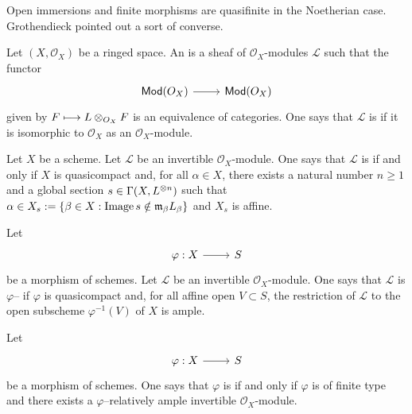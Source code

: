 \documentclass [11 pt, oneside] {article}
\begin{document}
Open immersions and finite morphisms are quasifinite in the Noetherian case. Grothendieck pointed out a sort of converse.

\begin{definition}\label{this oneno}\text{}
Let $(X,\mathscr{O}_X)$ be a ringed space. An  is a sheaf of $\mathscr{O}_X$-modules $\mathscr{L}$ such that the functor 
\[
\begin{tikzcd}
\catn{Mod}({\mathscr{O}_X})\ar[r]& \catn{Mod}({\mathscr{O}_X})
\end{tikzcd}
\]
given by $\relax{F}\longmapsto \relax{L}\otimes_{\relax{O}_X} \relax{F}$ is an equivalence of categories. One says that $\mathscr{L}$ is  if it is isomorphic to $\mathscr{O}_X$ as an $\mathscr{O}_X$-module.
\end{definition}

\begin{definition}\label{ample}\text{}
Let $X$ be a scheme. Let $\mathscr{L}$ be an invertible $\mathscr{O}_X$-module. One says that $\mathscr{L}$ is  if and only if $X$ is quasicompact and, for all $\alpha\in X$, there exists a natural number $n\ge 1$ and a global section $s\in \Gamma(X, \relax{L}^{\otimes n})$ such that $\alpha \in X_s := \{  \beta\in X :\operatorname{Image} s\notin \mathfrak{m}_\beta \relax{L}_\beta \}$ and $X_s$ is affine.
\end{definition}

\begin{definition}\label{}\text{}
Let 
\[
\begin{tikzcd}
\varphi :X\ar[r]& S
\end{tikzcd}
\]
be a morphism of schemes. Let $\mathscr{L}$ be an invertible $\mathscr{O}_X$-module. One says that $\mathscr{L}$ is $\varphi$-- if $\varphi$ is quasicompact and, for all affine open $V\subset S$, the restriction of $\mathscr{L}$ to the open subscheme $\varphi ^{-1}(V)$ of $X$ is ample.
\end{definition}

\begin{definition}\label{}\text{}
Let 
\[
\begin{tikzcd}
\varphi :X\ar[r]& S
\end{tikzcd}
\]
be a morphism of schemes. One says that $\varphi$ is  if and only if $\varphi$ is of finite type and there exists a $\varphi$--relatively ample invertible $\mathscr{O}_X$-module.
\end{definition}
\end{document}
